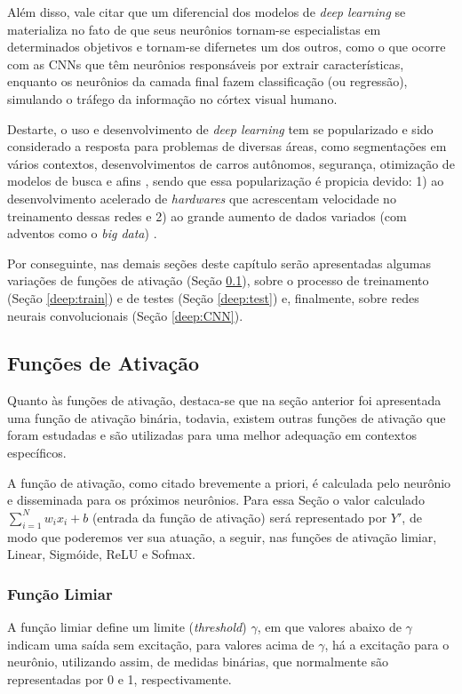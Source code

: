 Além disso, vale citar que um diferencial dos modelos de \textit{deep learning} se materializa no fato de que seus neurônios tornam-se especialistas em determinados objetivos e tornam-se difernetes um dos outros, como o que ocorre com as CNNs que têm neurônios responsáveis por extrair características, enquanto os neurônios da camada final fazem classificação (ou regressão), simulando o tráfego da informação no córtex visual humano.

Destarte, o uso e desenvolvimento de \textit{deep learning} tem se popularizado e sido considerado a resposta para problemas de diversas áreas, como segmentações em vários contextos, desenvolvimentos de carros autônomos, segurança, otimização de modelos de busca e afins \cite{Ghosh2019}, sendo que essa popularização é propicia devido: 1) ao desenvolvimento acelerado de \textit{hardwares} que acrescentam velocidade no treinamento dessas redes e 2) ao grande aumento de dados variados (com adventos como o \textit{big data}) \cite{Szegedy2015, ponti2018funciona}.

Por conseguinte, nas demais seções deste capítulo serão apresentadas algumas variações de funções de ativação (Seção \ref{deep:activation}), sobre o processo de treinamento (Seção \ref{deep:train}) e de testes (Seção \ref{deep:test}) e, finalmente, sobre redes neurais convolucionais (Seção \ref{deep:CNN}).


\subsection{Funções de Ativação}
\label{deep:activation}

Quanto às funções de ativação, destaca-se que na seção anterior foi apresentada uma função de ativação binária, todavia, existem outras funções de ativação que foram estudadas e são utilizadas para uma melhor adequação em contextos específicos.

A função de ativação, como citado brevemente a priori, é calculada pelo neurônio e disseminada para os próximos neurônios.  Para essa Seção o valor calculado $\sum_{i = 1}^{N} w_ix_i +b$ (entrada da função de ativação) será representado por $Y'$, de modo que poderemos ver sua atuação, a seguir, nas funções de ativação limiar, Linear, Sigmóide, ReLU e Sofmax.


\subsubsection{Função Limiar}
A função limiar define um limite (\textit{threshold}) $\gamma$, em que valores abaixo de $\gamma$ indicam uma saída sem excitação, para valores acima de $\gamma$, há a excitação para o neurônio, utilizando assim, de medidas binárias, que normalmente são representadas por 0 e 1, respectivamente.

